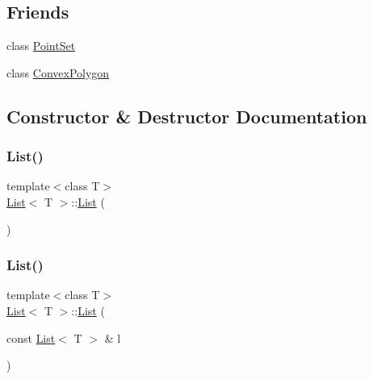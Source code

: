 \subsection*{Friends}
\begin{DoxyCompactItemize}
\item 
class \hyperlink{class_list_a7719ee4382f1049bf06f7136702ca280}{Point\+Set}
\item 
class \hyperlink{class_list_a3efb5f47c0842087c3076652f3d62832}{Convex\+Polygon}
\end{DoxyCompactItemize}


\subsection{Constructor \& Destructor Documentation}
\mbox{\label{class_list_a5c5e27671b21b3815d4e25b953c69454}} 
\subsubsection{\texorpdfstring{List()}{List()}\hspace{0.1cm}{\footnotesize\ttfamily [1/2]}}
{\footnotesize\ttfamily template$<$class T$>$ \\
\hyperlink{class_list}{List}$<$ T $>$\+::\hyperlink{class_list}{List} (\begin{DoxyParamCaption}{ }\end{DoxyParamCaption})\hspace{0.3cm}{\ttfamily [inline]}}

\mbox{\label{class_list_a5ccfa2e417b814e6217a16696e4eab5d}} 
\subsubsection{\texorpdfstring{List()}{List()}\hspace{0.1cm}{\footnotesize\ttfamily [2/2]}}
{\footnotesize\ttfamily template$<$class T$>$ \\
\hyperlink{class_list}{List}$<$ T $>$\+::\hyperlink{class_list}{List} (\begin{DoxyParamCaption}\item[{const \hyperlink{class_list}{List}$<$ T $>$ \&}]{l }\end{DoxyParamCaption})\hspace{0.3cm}{\ttfamily [inline]}}

